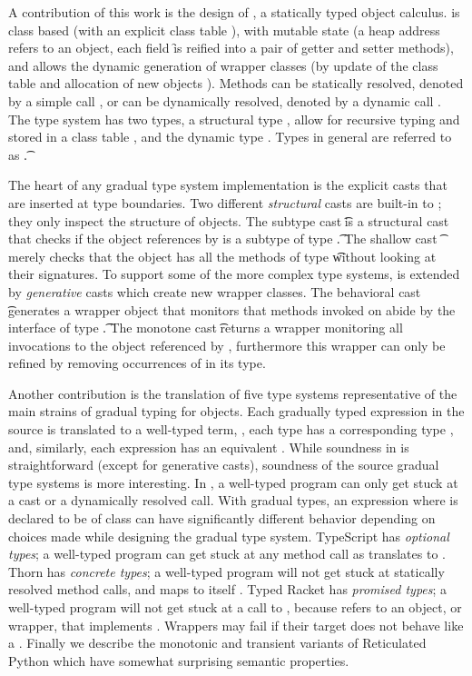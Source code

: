 \documentclass[a4paper,USenglish]{tex/lipics-v2016}
\renewcommand{\u}[1]{\underline{#1}\xspace}
\begin{document}
A contribution of this work is the design of \kafka, a statically typed object
calculus.  \kafka is class based (with an explicit class table \K), with mutable
state (a heap address \a refers to an object, each field \f is reified into a
pair of getter and setter methods), and allows the dynamic generation of wrapper
classes (by update of the class table \K and allocation of new objects \a).
Methods can be statically resolved, denoted by a simple call \Call\a\m\x, or can
be dynamically resolved, denoted by a dynamic call \DynCall\a\m\x. The \kafka
type system has two types, a structural type \C, allow for recursive typing 
and stored in a class table \K, and the dynamic
type \any. Types in general are referred to as \t.

The heart of any gradual type system implementation is the explicit casts
that are inserted at type boundaries.  Two different \emph{structural} casts
are built-in to \kafka; they only inspect the structure of objects.  The
subtype cast \SubCast\t\a is a structural cast that checks if the object
references by \a is a subtype of type \t. The shallow cast \ShaCast\t\a
merely checks that the object has all the methods of type \t without looking
at their signatures.  To support some of the more complex type systems,
\kafka is extended by \emph{generative} casts which create new wrapper
classes.  The behavioral cast \BehCast\t\a generates a wrapper object that
monitors that methods invoked on \a abide by the interface of type \t. The
monotone cast \MonCast\t\a returns a wrapper monitoring all invocations to
the object referenced by \a, furthermore this wrapper can only be refined by
removing occurrences of \any in its type.

Another contribution is the translation of five type systems representative
of the main strains of gradual typing for objects. Each gradually typed
expression \HT{\u\e}{\u\T} in the source is translated to a well-typed
\kafka term, \HT\e\T, each type \u\T has a corresponding \kafka type \T,
and, similarly, each expression \u\e has an equivalent \e. While soundness
in \kafka is straightforward (except for generative casts), soundness of the
source gradual type systems is more interesting.  In \kafka, a well-typed
program can only get stuck at a cast or a dynamically resolved call.  With
gradual types, an expression \Call{\u\x}\m{\u{\x'}} where \u\x is declared
to be of class \u\C can have significantly different behavior depending on
choices made while designing the gradual type system. TypeScript has
\emph{optional types}; a well-typed program can get stuck at any method call
as \u\C translates to \any. Thorn has \emph{concrete types}; a well-typed
program will not get stuck at statically resolved method calls, and \u\C
maps to itself \C. Typed Racket has \emph{promised types}; a well-typed
program will not get stuck at a call to \m, because \u\x refers to an
object, or wrapper, that implements \m.  Wrappers may fail if their target
does not behave like a \u\C. Finally we describe the monotonic
and transient variants of Reticulated Python which have somewhat surprising
semantic properties.
\end{document}
